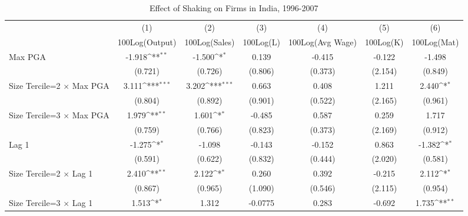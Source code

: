\begin{table}[htbp]\centering
\def\sym#1{\ifmmode^{#1}\else\(^{#1}\)\fi}
\caption{Effect of Shaking on Firms in India, 1996-2007}
\begin{tabular}{l*{6}{c}}
\toprule
                &\multicolumn{1}{c}{(1)}&\multicolumn{1}{c}{(2)}&\multicolumn{1}{c}{(3)}&\multicolumn{1}{c}{(4)}&\multicolumn{1}{c}{(5)}&\multicolumn{1}{c}{(6)}\\
                &\multicolumn{1}{c}{100Log(Output)}&\multicolumn{1}{c}{100Log(Sales)}&\multicolumn{1}{c}{100Log(L)}&\multicolumn{1}{c}{100Log(Avg Wage)}&\multicolumn{1}{c}{100Log(K)}&\multicolumn{1}{c}{100Log(Mat)}\\
\midrule
Max PGA         &   -1.918\sym{**} &   -1.500\sym{*}  &    0.139         &   -0.415         &   -0.122         &   -1.498         \\
                &  (0.721)         &  (0.726)         &  (0.806)         &  (0.373)         &  (2.154)         &  (0.849)         \\
\addlinespace
Size Tercile=2 $\times$ Max PGA&    3.111\sym{***}&    3.202\sym{***}&    0.663         &    0.408         &    1.211         &    2.440\sym{*}  \\
                &  (0.804)         &  (0.892)         &  (0.901)         &  (0.522)         &  (2.165)         &  (0.961)         \\
\addlinespace
Size Tercile=3 $\times$ Max PGA&    1.979\sym{**} &    1.601\sym{*}  &   -0.485         &    0.587         &    0.259         &    1.717         \\
                &  (0.759)         &  (0.766)         &  (0.823)         &  (0.373)         &  (2.169)         &  (0.912)         \\
\addlinespace
Lag 1           &   -1.275\sym{*}  &   -1.098         &   -0.143         &   -0.152         &    0.863         &   -1.382\sym{*}  \\
                &  (0.591)         &  (0.622)         &  (0.832)         &  (0.444)         &  (2.020)         &  (0.581)         \\
\addlinespace
Size Tercile=2 $\times$ Lag 1&    2.410\sym{**} &    2.122\sym{*}  &    0.260         &    0.392         &   -0.215         &    2.112\sym{*}  \\
                &  (0.867)         &  (0.965)         &  (1.090)         &  (0.546)         &  (2.115)         &  (0.954)         \\
\addlinespace
Size Tercile=3 $\times$ Lag 1&    1.513\sym{*}  &    1.312         &  -0.0775         &    0.283         &   -0.692         &    1.735\sym{**} \\

\end{tabular}
\end{table}
